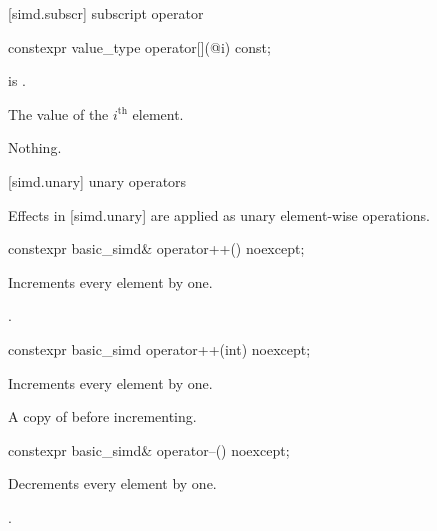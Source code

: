 [simd.subscr]{ subscript operator}

\begin{itemdecl}
constexpr value_type operator[](@\simdsizetype@ i) const;
\end{itemdecl}

\begin{itemdescr}
  \pnum\expects
   is .

  \pnum\returns
  The value of the $i^\text{th}$ element.

  \pnum\throws Nothing.
\end{itemdescr}

[simd.unary]{ unary operators}

\pnum
Effects in [simd.unary] are applied as unary element-wise operations.

\begin{itemdecl}
constexpr basic_simd& operator++() noexcept;
\end{itemdecl}

\begin{itemdescr}
  \pnum{}

  \pnum\effects
  Increments every element by one.

  \pnum\returns
  .
\end{itemdescr}

\begin{itemdecl}
constexpr basic_simd operator++(int) noexcept;
\end{itemdecl}

\begin{itemdescr}
  \pnum{}

  \pnum\effects
  Increments every element by one.

  \pnum\returns
  A copy of  before incrementing.
\end{itemdescr}

\begin{itemdecl}
constexpr basic_simd& operator--() noexcept;
\end{itemdecl}

\begin{itemdescr}
  \pnum{}

  \pnum\effects
  Decrements every element by one.

  \pnum\returns
  .
\end{itemdescr}

